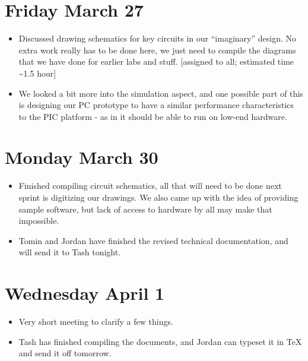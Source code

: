 \documentclass[11pt]{article}
\begin{document}
\section*{Friday March 27}
\label{sec:orgde39438}
\begin{itemize}
\item Discussed drawing schematics for key circuits in our ``imaginary'' design. No extra work 
really has to be done here, we just need to compile the diagrams that we have done for earlier
labs and stuff. [assigned to all; estimated time \textasciitilde{}1.5 hour]
\item We looked a bit more into the simulation aspect, and one possible part of this is designing our 
PC prototype to have a similar performance characteristics to the PIC platform - as in it should
be able to run on low-end hardware.
\end{itemize}
\section*{Monday March 30}
\label{sec:org659cd0b}
\begin{itemize}
\item Finished compiling circuit schematics, all that will need to be done next sprint is digitizing our
drawings. We also came up with the idea of providing sample software, but lack of access to hardware
by all may make that impossible.
\item Tomin and Jordan have finished the revised technical documentation, and will send it to Tash tonight.
\end{itemize}
\section*{Wednesday April 1}
\label{sec:org6adfe87}
\begin{itemize}
\item Very short meeting to clarify a few things.
\item Tash has finished compiling the documents, and Jordan can typeset it in \TeX{} and send it off
tomorrow.
\end{itemize}
\end{document}
